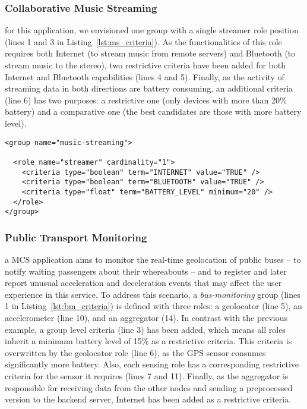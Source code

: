 
\subsubsection{Collaborative Music Streaming} for this application, we envisioned one group with a single streamer role position (lines 1 and 3 in Listing~\ref{lst:ms_criteria}). As the functionalities of this role requires both Internet (to stream music from remote servers) and Bluetooth (to stream music to the stereo), two restrictive criteria have been added for both Internet and Bluetooth capabilities (lines 4 and 5). Finally, as the activity of streaming data in both directions are battery consuming, an additional criteria (line 6) has two purposes: a restrictive one (only devices with more than 20\% battery) and a comparative one (the best candidates are those with more battery level).

\begin{lstlisting}[caption=Specification of the music streaming group, label=lst:ms_criteria, captionpos=t]
<group name="music-streaming">

  <role name="streamer" cardinality="1">
    <criteria type="boolean" term="INTERNET" value="TRUE" />
    <criteria type="boolean" term="BLUETOOTH" value="TRUE" />
    <criteria type="float" term="BATTERY_LEVEL" minimum="20" />
  </role>
</group>
\end{lstlisting}

\subsubsection{Public Transport Monitoring}  

a MCS application aims to monitor the real-time geolocation of public buses -- to notify waiting passengers about their whereabouts -- and to register and later report unusual acceleration and deceleration events that may affect the user experience in this service. To address this scenario, a \textit{bus-monitoring} group (lines 1 in Listing~\ref{lst:bm_criteria}) is defined with three roles: a geolocator (line 5), an accelerometer (line 10), and an aggregator (14). In contrast with the previous example, a group level criteria (line 3) has been added, which means all roles inherit a minimum battery level of 15\% as a restrictive criteria. This criteria is overwritten by the geolocator role (line 6), as the GPS sensor consumes significantly more battery. Also, each sensing role has a corresponding restrictive criteria for the sensor it requires (lines 7 and 11). Finally, as the aggregator is responsible for receiving data from the other nodes and sending a preprocessed version to the backend server, Internet has been added as a restrictive criteria.

